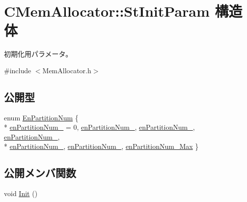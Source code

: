 \hypertarget{struct_c_mem_allocator_1_1_st_init_param}{}\section{C\+Mem\+Allocator\+:\+:St\+Init\+Param 構造体}
\label{struct_c_mem_allocator_1_1_st_init_param}


初期化用パラメータ。  




{\ttfamily \#include $<$Mem\+Allocator.\+h$>$}

\subsection*{公開型}
\begin{DoxyCompactItemize}
\item 
enum \hyperlink{struct_c_mem_allocator_1_1_st_init_param_a955c7d57350b1dcd81384b4d840f7640}{En\+Partition\+Num} \{ \\*
\hyperlink{struct_c_mem_allocator_1_1_st_init_param_a955c7d57350b1dcd81384b4d840f7640a0ca20bb8a5dd26dfe82bc2903de60fe4}{en\+Partition\+Num\+\_} = 0, 
\hyperlink{struct_c_mem_allocator_1_1_st_init_param_a955c7d57350b1dcd81384b4d840f7640af1d5bc5d22250ca125b054f37706040e}{en\+Partition\+Num\+\_}, 
\hyperlink{struct_c_mem_allocator_1_1_st_init_param_a955c7d57350b1dcd81384b4d840f7640a1312772dd3abeefbde69e0f507b8d779}{en\+Partition\+Num\+\_}, 
\hyperlink{struct_c_mem_allocator_1_1_st_init_param_a955c7d57350b1dcd81384b4d840f7640a7ba62b92898f629eaaa2a5897a6deb31}{en\+Partition\+Num\+\_}, 
\\*
\hyperlink{struct_c_mem_allocator_1_1_st_init_param_a955c7d57350b1dcd81384b4d840f7640a3c26d9f65ab34bfa454c0a2db921ec3f}{en\+Partition\+Num\+\_}, 
\hyperlink{struct_c_mem_allocator_1_1_st_init_param_a955c7d57350b1dcd81384b4d840f7640a440b4be066761dc8f92b8bea6fbbc837}{en\+Partition\+Num\+\_}, 
\hyperlink{struct_c_mem_allocator_1_1_st_init_param_a955c7d57350b1dcd81384b4d840f7640af07274577ae5023d78b56b2a9fdcc97e}{en\+Partition\+Num\+\_\+\+Max}
 \}
\end{DoxyCompactItemize}
\subsection*{公開メンバ関数}
\begin{DoxyCompactItemize}
\item 
void \hyperlink{struct_c_mem_allocator_1_1_st_init_param_a1638c147ccd7ff9868f832ae6ef17bdd}{Init} ()
\end{DoxyCompactItemize}
